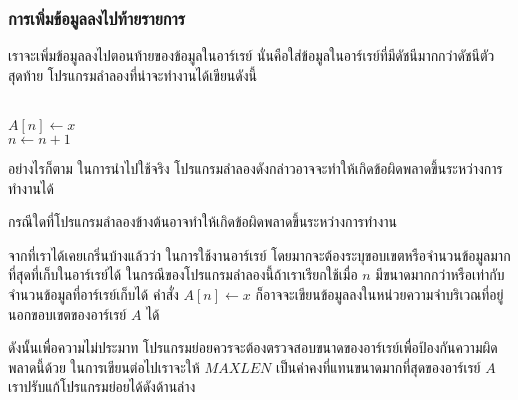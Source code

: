 \subsubsection{การ{\wbr}เพิ่ม{\wbr}ข้อมูล{\wbr}ลง{\wbr}ไป{\wbr}ท้าย{\wbr}รายการ}

เรา{\wbr}จะ{\wbr}เพิ่ม{\wbr}ข้อมูล{\wbr}ลง{\wbr}ไป{\wbr}ตอน{\wbr}ท้าย{\wbr}ของ{\wbr}ข้อมูล{\wbr}ใน{\wbr}อาร์เรย์
นั่น{\wbr}คือ{\wbr}ใส่{\wbr}ข้อมูล{\wbr}ใน{\wbr}อาร์เรย์{\wbr}ที่{\wbr}มี{\wbr}ดัชนี{\wbr}มาก{\wbr}กว่า{\wbr}ดัชนี{\wbr}ตัว{\wbr}สุดท้าย{\wbr}
โปรแกรม{\wbr}ลำ{\wbr}ลอง{\wbr}ที่{\wbr}น่าจะ{\wbr}ทำงาน{\wbr}ได้{\wbr}เขียน{\wbr}ดังนี้{\wbr}

\begin{algt}
\\
\hspace*{0.2in} $A[n] \leftarrow x$\\
\hspace*{0.2in} $n \leftarrow n + 1$
\end{algt}

อย่างไรก็ตาม ใน{\wbr}การ{\wbr}นำ{\wbr}ไป{\wbr}ใช้{\wbr}จริง โปรแกรม{\wbr}ลำ{\wbr}ลอง{\wbr}ดังกล่าว{\wbr}อาจ{\wbr}จะ{\wbr}ทำ{\wbr}ให้{\wbr}เกิด{\wbr}ข้อผิดพลาด{\wbr}ขึ้น{\wbr}ระหว่าง{\wbr}การ{\wbr}ทำงาน{\wbr}ได้{\wbr}

\begin{quiz}{}
กรณี{\wbr}ใด{\wbr}ที่{\wbr}โปรแกรม{\wbr}ลำ{\wbr}ลอง{\wbr}ข้างต้น{\wbr}อาจ{\wbr}ทำ{\wbr}ให้{\wbr}เกิด{\wbr}ข้อผิดพลาด{\wbr}ขึ้น{\wbr}ระหว่าง{\wbr}การ{\wbr}ทำงาน{\wbr}
\end{quiz}
\begin{quizans}
จาก{\wbr}ที่{\wbr}เรา{\wbr}ได้{\wbr}เคย{\wbr}เกริ่น{\wbr}บ้าง{\wbr}แล้ว{\wbr}ว่า ใน{\wbr}การ{\wbr}ใช้{\wbr}งาน{\wbr}อาร์เรย์
โดยมาก{\wbr}จะ{\wbr}ต้อง{\wbr}ระบุ{\wbr}ขอบเขต{\wbr}หรือ{\wbr}จำนวน{\wbr}ข้อมูล{\wbr}มาก{\wbr}ที่สุด{\wbr}ที่{\wbr}เก็บ{\wbr}ใน{\wbr}อาร์เรย์{\wbr}ได้{\wbr}
ใน{\wbr}กรณี{\wbr}ของ{\wbr}โปรแกรม{\wbr}ลำ{\wbr}ลอง{\wbr}นี้{\wbr}ถ้า{\wbr}เรา{\wbr}เรียก{\wbr}ใช้{\wbr}เมื่อ $n$
มี{\wbr}ขนาด{\wbr}มาก{\wbr}กว่า{\wbr}หรือ{\wbr}เท่า{\wbr}กับ{\wbr}จำนวน{\wbr}ข้อมูล{\wbr}ที่{\wbr}อาร์เรย์{\wbr}เก็บ{\wbr}ได้ คำสั่ง $A[n]\leftarrow x$
ก็{\wbr}อาจ{\wbr}จะ{\wbr}เขียน{\wbr}ข้อมูล{\wbr}ลง{\wbr}ใน{\wbr}หน่วยความจำ{\wbr}บริเวณ{\wbr}ที่อยู่{\wbr}นอก{\wbr}ขอบเขต{\wbr}ของ{\wbr}อาร์เรย์ $A$ ได้{\wbr}
\end{quizans}

ดังนั้น{\wbr}เพื่อ{\wbr}ความ{\wbr}ไม่{\wbr}ประมาท{\wbr}
โปรแกรมย่อย{\wbr}ควร{\wbr}จะ{\wbr}ต้อง{\wbr}ตรวจสอบ{\wbr}ขนาด{\wbr}ของ{\wbr}อาร์เรย์{\wbr}เพื่อ{\wbr}ป้องกัน{\wbr}ความผิด{\wbr}พลาด{\wbr}นี้{\wbr}ด้วย{\wbr}
ใน{\wbr}การ{\wbr}เขียน{\wbr}ต่อไป{\wbr}เรา{\wbr}จะ{\wbr}ให้ $MAXLEN$ เป็น{\wbr}ค่าคงที่{\wbr}แทน{\wbr}ขนาด{\wbr}มาก{\wbr}ที่สุด{\wbr}ของ{\wbr}อาร์เรย์ $A$
เรา{\wbr}ปรับ{\wbr}แก้{\wbr}โปรแกรมย่อย{\wbr}ได้{\wbr}ดัง{\wbr}ด้าน{\wbr}ล่าง{\wbr}

